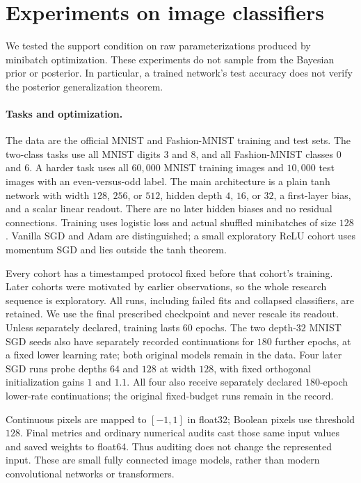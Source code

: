 \section{Experiments on image classifiers}
\label{sec:image-experiments}

We tested the support condition on raw parameterizations produced by
minibatch optimization. These experiments do not sample from the Bayesian
prior or posterior. In particular, a trained network's test accuracy does
not verify the posterior generalization theorem.

\paragraph{Tasks and optimization.}
The data are the official MNIST and Fashion-MNIST training and test sets.
The two-class tasks use all MNIST digits 3 and 8, and all Fashion-MNIST
classes 0 and 6. A harder task uses all $60{,}000$ MNIST training images
and $10{,}000$ test images with an even-versus-odd label. The main
architecture is a plain tanh network with width $128$, $256$, or $512$,
hidden depth $4$, $16$, or $32$, a first-layer bias, and a scalar linear
readout. There are no later hidden biases and no residual connections.
Training uses logistic loss and actual shuffled minibatches of size $128$.
Vanilla SGD and Adam are distinguished; a small exploratory ReLU cohort
uses momentum SGD and lies outside the tanh theorem.

Every cohort has a timestamped protocol fixed before that cohort's
training. Later cohorts were motivated by earlier observations, so the
whole research sequence is exploratory. All runs, including failed fits
and collapsed classifiers, are retained. We use the final prescribed
checkpoint and never rescale its readout. Unless separately declared,
training lasts $60$ epochs. The two depth-$32$ MNIST SGD seeds also have
separately recorded continuations for $180$ further epochs, at a fixed
lower learning rate; both original models remain in the data.
Four later SGD runs probe depths $64$ and $128$ at width $128$, with
fixed orthogonal initialization gains $1$ and $1.1$.
All four also receive separately declared $180$-epoch lower-rate
continuations; the original fixed-budget runs remain in the record.

Continuous pixels are mapped to $[-1,1]$ in float32; Boolean pixels use
threshold $128$. Final metrics and ordinary numerical audits cast those
same input values and saved weights to float64. Thus auditing does not
change the represented input. These are small fully connected image
models, rather than modern convolutional networks or transformers.

